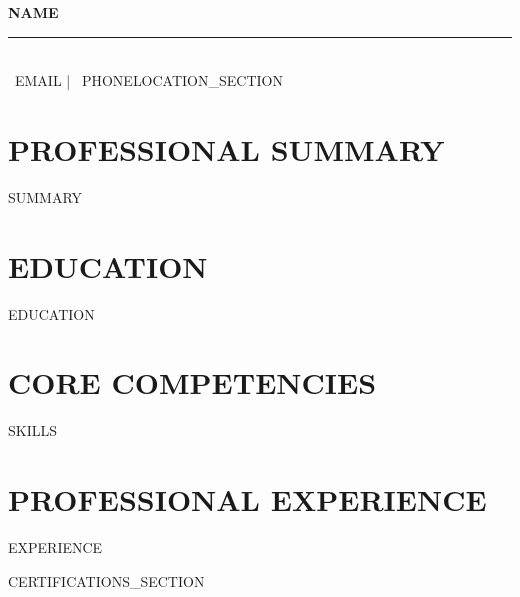 \documentclass[11pt,a4paper]{article}
\begin{document}
\begin{center}
  {\Huge\bfseries\color{textgray} {{NAME}}}\\[0.4em]
  {\color{sectionteal}\rule{0.3\textwidth}{0.5pt}}\\[0.3em]
  {\small \faEnvelope\ {{EMAIL}} \quad | \quad \faPhone\ {{PHONE}}{{LOCATION_SECTION}}}
\end{center}

\vspace{0.3cm}

\section*{PROFESSIONAL SUMMARY}
\textcolor{textgray}{{{SUMMARY}}}

\section*{EDUCATION}
{{EDUCATION}}

\section*{CORE COMPETENCIES}
\textcolor{textgray}{{{SKILLS}}}

\section*{PROFESSIONAL EXPERIENCE}
{{EXPERIENCE}}

{{CERTIFICATIONS_SECTION}}
\end{document}
